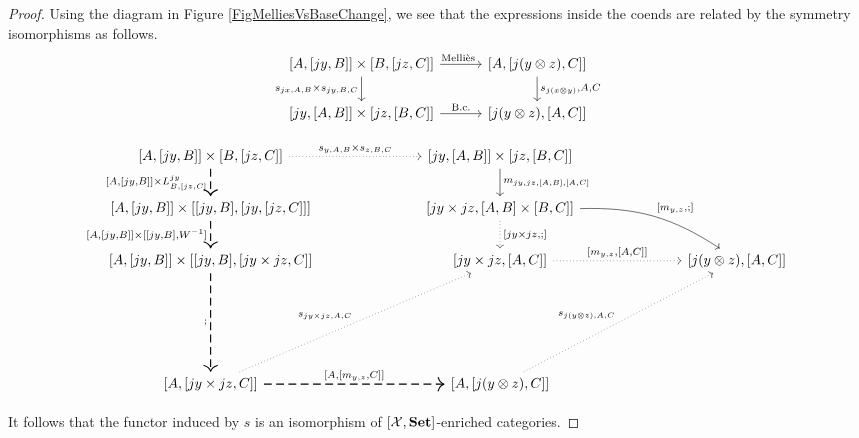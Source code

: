 \begin{proof}
  Using the diagram in Figure \ref{FigMelliesVsBaseChange}, we see that the expressions inside the coends are related by the symmetry isomorphisms as follows.
  \[
    \begin{tikzcd}[column sep=30pt]
      {[A,[jy,B]] \times [B,[jz,C]]} \arrow[r, "\text{\Mellies}" xshift=-2pt] \arrow[d, "{s_{jx,A,B}\times s_{jy,B,C}}"']
        & {[A,[j(y\tensor z),C]]} \arrow[d, "{s_{j(x\tensor y)},A,C}"] \\
      {[jy,[A,B]]\times [jz,[B,C]]} \arrow[r, "\text{B.c.}"]
        & {[j(y \tensor z),[A,C]]}
    \end{tikzcd}
    \]
  \begin{SidewaysFigure}
    \[
      \begin{tikzcd}[ampersand replacement=\&, column sep=73pt, row sep=20pt]
        {[A,[jy,B]] \times [B,[jz,C]]} \arrow[d, "{[A,[jy,B]] \times L_{B,[jz,C]}^{jy}}"', thick, dashed] \arrow[r, "{s_{y,A,B}\times s_{z,B,C}}", dotted]
          \& {[jy,[A,B]] \times [jz,[B,C]]} \arrow[d, "{m_{jy,jz,[A,B],[A,C]}}"]
            \& \\
        {[A,[jy,B]] \times [[jy,B],[jy,[jz,C]]]} \arrow[d, "{[A,[jy,B]]\times[[jy,B],W\inv]}"', thick, dashed]
          \& |[alias=Z]| {[jy \times jz,[A,B]\times[B,C]]} \arrow[d, "{[jy\times jz,;]}", dotted] \arrow[dr, "{[m_{y,z},;]}", bend left=17.5, from=Z.east]
            \& \\
        {[A,[jy,B]]} \times [[jy,B],[jy\times jz,C]] \arrow[d, ";"', thick, dashed]
          \& {[jy \times jz,[A,C]]} \arrow[r, "{[m_{y,z},[A,C]]}", dotted]
            \& {[j(y\tensor z),[A,C]]} \\[51pt]
        {[A,[jy \times jz,C]]} \arrow[ur, "{s_{jy\times jz,A,C}}", dotted] \arrow[r, "{[A,[m_{y,z},C]]}", thick, dashed]
          \& {[A,[j(y\tensor z),C]]} \arrow[ur, "{s_{j(y\tensor z),A,C}}", dotted]
            \&
      \end{tikzcd}
      \]
      \caption[\Mellies composition and base-changed composition agree for symmetric reader actions on $\Set$.]%
      {Proof that \Mellies composition agrees with base-changed composition in the case of a symmetric reader action on $\Set$.  
      The \Mellies composition is given by the thick dashed arrows, while the composition in the base-changed category is given by the thin arrows.
      The dotted lines at the top and at the bottom right -- given by the symmetry isomorphisms -- mediate between the two.
      We can verify that the main heptagon commutes by directly computing each direction: in each case, a pair $\langle f,g\rangle$ of functions is sent to the function $h \from A \to {[jy\times jz,C]}$ given by
      \[
        h(a)(Y,Z) = g(f(a)(Y))(Z)\,.
        \]}
      \label{FigMelliesVsBaseChange}
  \end{SidewaysFigure}
  It follows that the functor induced by $s$ is an isomorphism of $[\mathcal X,{\normalfont\textbf{Set}}]$-enriched categories.
\end{proof}


